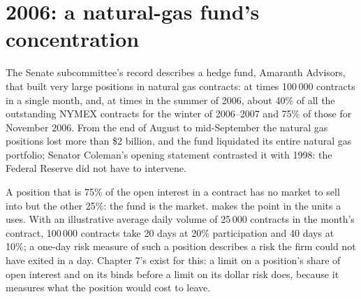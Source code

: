 \section{2006: a natural-gas fund's concentration}

The Senate subcommittee's record describes a hedge fund, Amaranth Advisors, that built very large positions in natural gas contracts: at times 100\,000 contracts in a single month, and, at times in the summer of 2006, about 40\% of all
the outstanding NYMEX contracts for the winter of 2006--2007 and 75\% of those for November 2006. From the end of August to mid-September the natural
gas positions lost more than \$2 billion, and the fund liquidated its entire natural gas portfolio; Senator Coleman's opening statement contrasted it with 1998: the
Federal Reserve did not have to intervene.

\begin{omfigure}
\par
{}\label{fig:fm:case-studies-i:amaranth}
\end{omfigure}

A position that is 75\% of the open interest in a contract has no market to sell into but the other 25\%: the fund is the market. 
makes the point in the units a  uses. With an illustrative average daily volume of 25\,000 contracts in the month's contract, 100\,000
contracts take 20 days at 20\% participation and 40 days at 10\%; a one-day risk measure of such a position describes a risk the firm could not
have exited in a day. Chapter 7's  exist for this: a limit on a position's share of open interest and on its 
binds before a limit on its dollar risk does, because it measures what the position would cost to leave.

